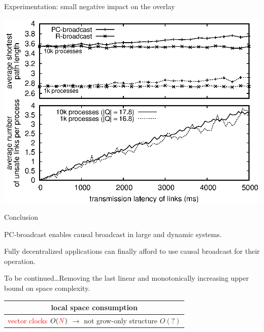 \documentclass[10pt, xcolor={usenames, dvipsnames}]{beamer}
\newcommand{\NO}[1]{\textcolor{red}{#1}}
\begin{document}
\begin{frame}{Experimentation: small negative impact on the overlay}

  \begin{center}
    \includegraphics[width=1\textwidth]{img/delay.eps}
  \end{center}

\end{frame}

\begin{frame}{Conclusion}
  
  PC-broadcast enables causal broadcast in large and dynamic systems. 
  
  \vspace{1em}

  Fully decentralized applications can finally afford to use causal broadcast
  for their operation.


  \begin{table}
    
  \end{table}


\end{frame}

\begin{frame}[standout]
  To be continued\ldots Removing the last linear and monotonically increasing upper bound on space complexity.
  
  \vspace{2em}
  
  \small 
  \begin{table}
    \begin{tabularx}{0.67\columnwidth}{@{}c@{}}
      local space consumption \\
      \hline\hline
      \NO{vector clocks} $O(\NO{N})$ $\rightarrow$ not grow-only structure $O(?)$
    \end{tabularx}
  \end{table}
  
\end{frame}
\end{document}
